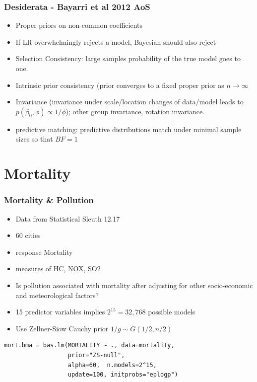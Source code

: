 \documentclass[handout]{beamer}
\begin{document}
\begin{frame}\frametitle{Desiderata - Bayarri et al 2012 AoS}
  \begin{itemize}
  \item Proper priors on non-common coefficients \pause
  \item If LR overwhelmingly rejects a model, Bayesian should also
    reject \pause
  \item Selection Consistency: large samples probability of the true model goes
    to one. \pause
  \item Intrinsic prior consistency (prior converges to a fixed proper
    prior as $n \to \infty$  \pause
  \item Invariance  (invariance under scale/location changes of
    data/model leads to $p(\beta_0, \phi) \propto 1/\phi$); other
    group invariance, rotation invariance.  \pause
\item predictive matching:  predictive distributions match under
  minimal sample sizes so that $BF = 1$
  \end{itemize}
  
\end{frame}
\section{Mortality}
\begin{frame}[fragile]
\frametitle{Mortality \& Pollution}
  \begin{itemize}
  \item Data from Statistical Sleuth 12.17 \pause 
  \item 60 cities \pause 
\item response Mortality \pause 
\item measures of HC, NOX, SO2 \pause 
\item Is pollution associated with mortality after adjusting for other
  socio-economic and meteorological factors? \pause 
\item 15 predictor variables implies $2^{15} = 32,768$ possible models
  \pause 
\item Use Zellner-Siow Cauchy prior  $1/g \sim  G(1/2, n/2)$
  \end{itemize}
\begin{verbatim}
mort.bma = bas.lm(MORTALITY ~ ., data=mortality,
                  prior="ZS-null", 
                  alpha=60,  n.models=2^15, 
                  update=100, initprobs="eplogp")
\end{verbatim}
\end{frame}
\end{document}

